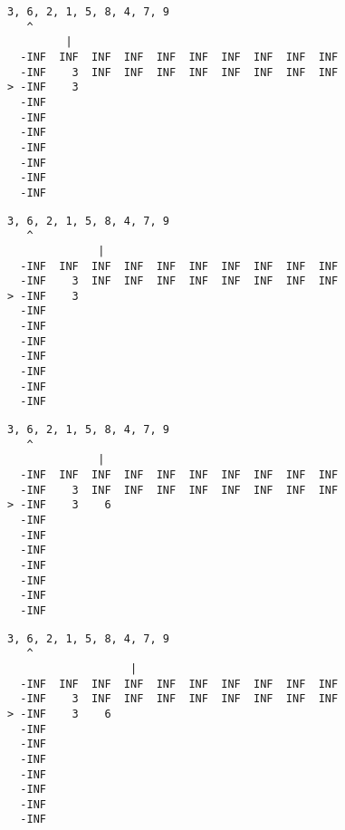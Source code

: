 { \begin{verbatim}
3, 6, 2, 1, 5, 8, 4, 7, 9
   ^
         |
  -INF  INF  INF  INF  INF  INF  INF  INF  INF  INF
  -INF    3  INF  INF  INF  INF  INF  INF  INF  INF
> -INF    3                                        
  -INF                                             
  -INF                                             
  -INF                                             
  -INF                                             
  -INF                                             
  -INF                                             
  -INF                                             
\end{verbatim} }

{ \begin{verbatim}
3, 6, 2, 1, 5, 8, 4, 7, 9
   ^
              |
  -INF  INF  INF  INF  INF  INF  INF  INF  INF  INF
  -INF    3  INF  INF  INF  INF  INF  INF  INF  INF
> -INF    3                                        
  -INF                                             
  -INF                                             
  -INF                                             
  -INF                                             
  -INF                                             
  -INF                                             
  -INF                                             
\end{verbatim} }

{ \begin{verbatim}
3, 6, 2, 1, 5, 8, 4, 7, 9
   ^
              |
  -INF  INF  INF  INF  INF  INF  INF  INF  INF  INF
  -INF    3  INF  INF  INF  INF  INF  INF  INF  INF
> -INF    3    6                                   
  -INF                                             
  -INF                                             
  -INF                                             
  -INF                                             
  -INF                                             
  -INF                                             
  -INF                                             
\end{verbatim} }

{ \begin{verbatim}
3, 6, 2, 1, 5, 8, 4, 7, 9
   ^
                   |
  -INF  INF  INF  INF  INF  INF  INF  INF  INF  INF
  -INF    3  INF  INF  INF  INF  INF  INF  INF  INF
> -INF    3    6                                   
  -INF                                             
  -INF                                             
  -INF                                             
  -INF                                             
  -INF                                             
  -INF                                             
  -INF                                             
\end{verbatim} }

